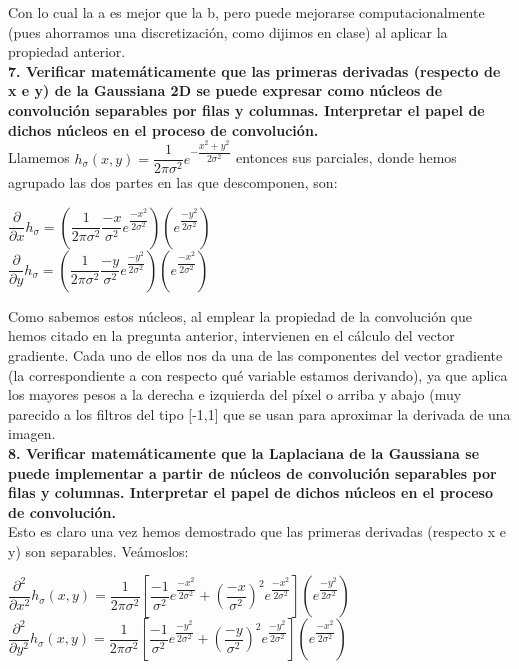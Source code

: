 \documentclass[10pt,a4paper]{article}
\begin{document}
Con lo cual la a es mejor que la b, pero puede mejorarse computacionalmente (pues ahorramos una discretización, como dijimos en clase) al aplicar la propiedad anterior.\\

\textbf{7. Verificar matemáticamente que las primeras derivadas (respecto de x e y) de la Gaussiana 2D se puede expresar como núcleos de convolución separables por filas y columnas. Interpretar el papel de dichos núcleos en el proceso de convolución.}\\

Llamemos $h_{\sigma}(x,y) = \dfrac{1}{2\pi\sigma^2}e^{-\dfrac{x^2+y^2}{2\sigma^2}}$ entonces sus parciales, donde hemos agrupado las dos partes en las que descomponen, son:\\

\begin{center}
$\dfrac{\partial}{\partial x}h_{\sigma} = \left( \dfrac{1}{2\pi\sigma^2} \dfrac{-x}{\sigma^2} e^{\dfrac{-x^2}{2\sigma^2}}\right)\left( e^{\dfrac{-y^2}{2\sigma^2}} \right)$\\
$\dfrac{\partial}{\partial y}h_{\sigma} = \left( \dfrac{1}{2\pi\sigma^2} \dfrac{-y}{\sigma^2} e^{\dfrac{-y^2}{2\sigma^2}}\right)\left( e^{\dfrac{-x^2}{2\sigma^2}} \right)$\\
\end{center}

Como sabemos estos núcleos, al emplear la propiedad de la convolución que hemos citado en la pregunta anterior, intervienen en el cálculo del vector gradiente. Cada uno de ellos nos da una de las componentes del vector gradiente (la correspondiente a con respecto qué variable estamos derivando), ya que aplica los mayores pesos a la derecha e izquierda del píxel o arriba y abajo (muy parecido a los filtros del tipo [-1,1] que se usan para aproximar la derivada de una imagen.\\

\textbf{8. Verificar matemáticamente que la Laplaciana de la Gaussiana se puede implementar a partir de núcleos de convolución separables por filas y columnas. Interpretar el papel de dichos núcleos en el proceso de convolución.}\\

Esto es claro una vez hemos demostrado que las primeras derivadas (respecto x e y) son separables. Veámoslos:

$\dfrac{\partial^2}{\partial x^2}h_{\sigma}(x,y) = \dfrac{1}{2\pi \sigma^2}\left[ \dfrac{-1}{\sigma^2}e^{\dfrac{-x^2}{2\sigma^2}} + \left( \dfrac{-x}{\sigma^2}\right)^2 e^{\dfrac{-x^2}{2\sigma^2}} \right]\left( e^{\dfrac{-y^2}{2\sigma^2}} \right)$\\
$\dfrac{\partial^2}{\partial y^2}h_{\sigma}(x,y) = \dfrac{1}{2\pi \sigma^2}\left[ \dfrac{-1}{\sigma^2}e^{\dfrac{-y^2}{2\sigma^2}} + \left( \dfrac{-y}{\sigma^2}\right)^2 e^{\dfrac{-y^2}{2\sigma^2}} \right]\left( e^{\dfrac{-x^2}{2\sigma^2}} \right)$\\
\end{document}
